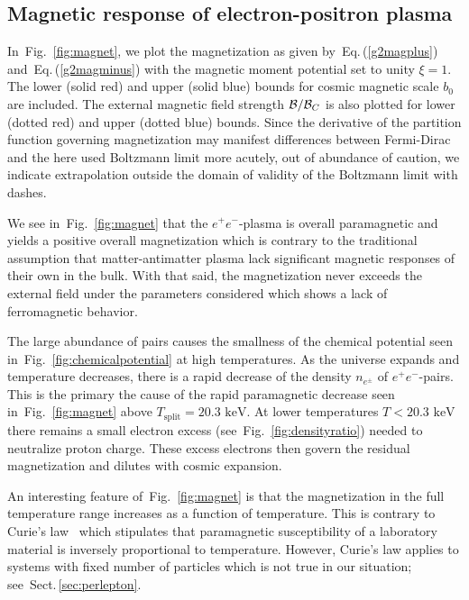 \documentclass[aps,prd,floatfix,reprint]{revtex4-2}
\newcommand*{\keV}{\text{ keV}}
\newcommand{\req}[1]{Eq.\,(\ref{#1})}
\newcommand{\rf}[1]{Fig.~{\ref{#1}}}
\newcommand{\rsec}[1]{Sect.\,{\ref{#1}}}
\begin{document}
\subsection{Magnetic response of electron-positron plasma}
\label{sec:paramagnetism}
\noindent In~\rf{fig:magnet}, we plot the magnetization as given by~\req{g2magplus} and~\req{g2magminus} with the magnetic moment potential set to unity $\xi=1$. The lower (solid red) and upper (solid blue) bounds for cosmic magnetic scale $b_{0}$ are included. The external magnetic field strength ${\cal B}/{\cal B}_{C}$ is also plotted for lower (dotted red) and upper (dotted blue) bounds. Since the derivative of the partition function governing magnetization may manifest differences between Fermi-Dirac and the here used Boltzmann limit more acutely, out of abundance of caution, we indicate extrapolation outside the domain of validity of the Boltzmann limit with dashes.

We see in~\rf{fig:magnet} that the $e^{+}e^{-}$-plasma is overall paramagnetic and yields a positive overall magnetization which is contrary to the traditional assumption that matter-antimatter plasma lack significant magnetic responses of their own in the bulk. With that said, the magnetization never exceeds the external field under the parameters considered which shows a lack of ferromagnetic behavior. 

The large abundance of pairs causes the smallness of the chemical potential seen in~\rf{fig:chemicalpotential} at high temperatures. As the universe expands and temperature decreases, there is a rapid decrease of the density $n_{e^{\pm}}$ of $e^{+}e^{-}$-pairs. This is the primary the cause of the rapid paramagnetic decrease seen in~\rf{fig:magnet} above $T_\mathrm{split}=20.3\keV$. At lower temperatures $T<20.3\keV$ there remains a small electron excess (see~\rf{fig:densityratio}) needed to neutralize proton charge. These excess electrons then govern the residual magnetization and dilutes with cosmic expansion.

An interesting feature of~\rf{fig:magnet} is that the magnetization in the full temperature range increases as a function of temperature. This is contrary to Curie's law~\cite{greiner2012thermodynamics} which stipulates that paramagnetic susceptibility of a laboratory material is inversely proportional to temperature. However, Curie's law applies to systems with fixed number of particles which is not true in our situation; see~\rsec{sec:perlepton}.
\end{document}
